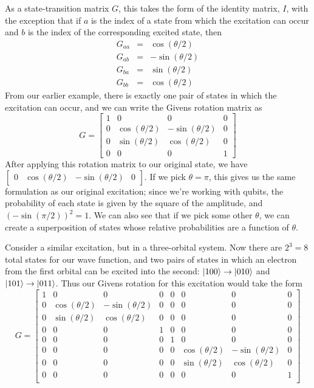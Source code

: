 \documentclass[11pt]{article}
\begin{document}
As a state-transition matrix $G$, this takes the form of the identity matrix, $I$, with the exception that if $a$ is the index of a state from which the excitation can occur and $b$ is the index of the corresponding excited state, then 
$$
\begin{array}{rcr}
     G_{aa} &=& \cos(\theta/2) \\
     G_{ab} &=& -\sin(\theta/2) \\
     G_{ba} &=& \sin(\theta/2) \\
     G_{bb} &=& \cos(\theta/2)
\end{array}
$$ 
From our earlier example, there is exactly one pair of states in which the excitation can occur, and we can write the Givens rotation matrix as 
$$
G = \left[\begin{array}{cccc}
   1 & 0 & 0 & 0 \\
   0 & \cos(\theta/2) & -\sin(\theta/2) & 0 \\
   0 & \sin(\theta/2) & \cos(\theta/2) & 0 \\
   0 & 0 & 0 & 1
\end{array}
\right]
$$
After applying this rotation matrix to our original state, we have $
\left[\begin{array}{cccc}
    0 & \cos(\theta/2) & -\sin(\theta/2) & 0
\end{array}
\right]
$. If we pick $\theta = \pi$, this gives us the same formulation as our original excitation; since we're working with qubits, the probability of each state is given by the square of the amplitude, and $(-\sin(\pi/2))^2 = 1$. We can also see that if we pick some other $\theta$, we can create a superposition of states whose relative probabilities are a function of $\theta$.

Consider a similar excitation, but in a three-orbital system. Now there are $2^3 = 8$ total states for our wave function, and two pairs of states in which an electron from the first orbital can be excited into the second: $\ket{100} \to \ket{010}$ and $\ket{101} \to \ket{011}$. Thus our Givens rotation for this excitation would take the form 
$$ G = 
\left[\begin{array}{cccccccc}
1 & 0 & 0 & 0 & 0 & 0 & 0 & 0 \\
0 & \cos(\theta/2) & -\sin(\theta/2) & 0 & 0 & 0 & 0 & 0 \\
0 & \sin(\theta/2) & \cos(\theta/2) & 0 & 0 & 0 & 0 & 0 \\
0 & 0 & 0 & 1 & 0 & 0 & 0 & 0 \\
0 & 0 & 0 & 0 & 1 & 0 & 0 & 0 \\
0 & 0 & 0 & 0 & 0 & \cos(\theta/2) & -\sin(\theta/2) & 0 \\
0 & 0 & 0 & 0 & 0 & \sin(\theta/2) & \cos(\theta/2) & 0 \\
0 & 0 & 0 & 0 & 0 & 0 & 0 & 1 \\
\end{array} \right]
$$
\end{document}

